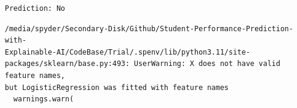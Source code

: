\documentclass[11pt]{article}
\begin{document}
    \begin{Verbatim}[commandchars=\\\{\}]
Prediction: No
    \end{Verbatim}

    \begin{Verbatim}[commandchars=\\\{\}]
/media/spyder/Secondary-Disk/Github/Student-Performance-Prediction-with-
Explainable-AI/CodeBase/Trial/.spenv/lib/python3.11/site-
packages/sklearn/base.py:493: UserWarning: X does not have valid feature names,
but LogisticRegression was fitted with feature names
  warnings.warn(
    \end{Verbatim}


    
    
    
\end{document}
